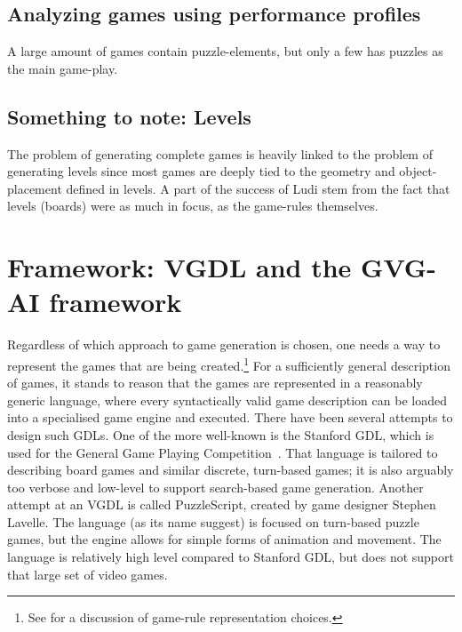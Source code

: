\documentclass[a4paper,titlepage,final, twoside]{report}
\begin{document}
\subsection{Analyzing games using performance profiles}
A large amount of games contain puzzle-elements, but only a few has puzzles as the main game-play.


\subsection{Something to note: Levels}
\label{ssec_notelevels}
The problem of generating complete games is heavily linked to the problem of generating levels since most games are deeply tied to the geometry and object-placement defined in levels.
A part of the success of Ludi stem from the fact that levels (boards) were as much in focus, as the game-rules themselves.





\section{Framework: VGDL and the GVG-AI framework}
Regardless of which approach to game generation is chosen, one needs a way to represent the games that are being created.\footnote{See \citet{pcgbook:ch6} for a discussion of game-rule representation choices.} For a sufficiently general description of games, it stands to reason that the games are represented in a reasonably generic language, where every syntactically valid game description can be loaded into a specialised game engine and executed. 
There have been several attempts to design such GDLs. One of the more well-known is the Stanford GDL, which is used for the General Game Playing Competition~\citet{genesereth2005general}. That language is tailored to describing board games and similar discrete, turn-based games; it is also arguably too verbose and low-level to support search-based game generation. 
Another attempt at an VGDL is called PuzzleScript, created by game designer Stephen Lavelle. The language (as its name suggest) is focused on turn-based puzzle games, but the engine allows for simple forms of animation and movement. The language is relatively high level compared to Stanford GDL, but does not support that large set of video games.
\end{document}

